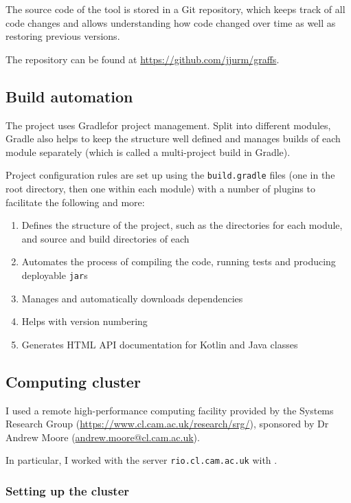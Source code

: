 The source code of the \graffs tool is stored in a Git repository, which keeps track of all code changes and allows understanding how code changed over time as well as restoring previous versions.

The repository can be found at \url{https://github.com/jjurm/graffs}.

\subsection{Build automation}

The project uses Gradle\citeneeded for project management.
Split into different modules, Gradle also helps to keep the structure well defined and manages builds of each module separately (which is called a multi-project build in Gradle).

Project configuration rules are set up using the \texttt{build.gradle} files (one in the root directory, then one within each module) with a number of plugins to facilitate the following and more:
\begin{enumerate}
    \item Defines the structure of the project, such as the directories for each module, and source and build directories of each
    \item Automates the process of compiling the code, running tests and producing deployable \texttt{jar}s
    \item Manages and automatically downloads dependencies
    \item Helps with version numbering
    \item Generates HTML API documentation for Kotlin and Java classes
\end{enumerate}



\subsection{Computing cluster}\label{sec:computing_cluster}

I used a remote high-performance computing facility provided by the Systems Research Group (\url{https://www.cl.cam.ac.uk/research/srg/}), sponsored by Dr Andrew Moore (\url{andrew.moore@cl.cam.ac.uk}).

In particular, I worked with the server \texttt{rio.cl.cam.ac.uk} with .

\subsubsection{Setting up the cluster}

